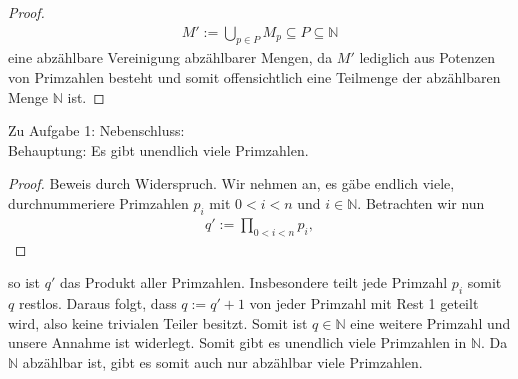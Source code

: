 \documentclass{scrreprt}
\newcommand{\NN}{\mathbb{N}}
\begin{document}
\begin{enumerate}[(a)]
\begin{proof}
				\begin{align*}
					M' := \bigcup\limits_{p \in P} M_p \subseteq P \subseteq \NN
				\end{align*}
				eine abzählbare Vereinigung abzählbarer Mengen, da $M'$ lediglich aus Potenzen von Primzahlen besteht und somit offensichtlich eine Teilmenge der abzählbaren Menge $\NN$ ist.
			\end{proof}
	\end{enumerate}
	\pagebreak
	Zu Aufgabe 1: Nebenschluss:\\
	Behauptung: Es gibt unendlich viele Primzahlen.
	\begin{proof}
		Beweis durch Widerspruch. Wir nehmen an, es gäbe endlich viele, durchnummeriere Primzahlen $p_i$ mit $0 < i < n$ und $i \in \NN$. Betrachten wir nun
		\begin{align*}
			q' := \prod\limits_{0 < i < n} p_i,
		\end{align*}
	\end{proof}
	so ist $q'$ das Produkt aller Primzahlen. Insbesondere teilt jede Primzahl $p_i$ somit $q$ restlos. Daraus folgt, dass $q := q' + 1$ von jeder Primzahl mit Rest 1 geteilt wird, also keine trivialen Teiler besitzt. Somit ist $q \in \NN$ eine weitere Primzahl und unsere Annahme ist widerlegt. Somit gibt es unendlich viele Primzahlen in $\NN$. Da $\NN$ abzählbar ist, gibt es somit auch nur abzählbar viele Primzahlen.
		
\end{document}
